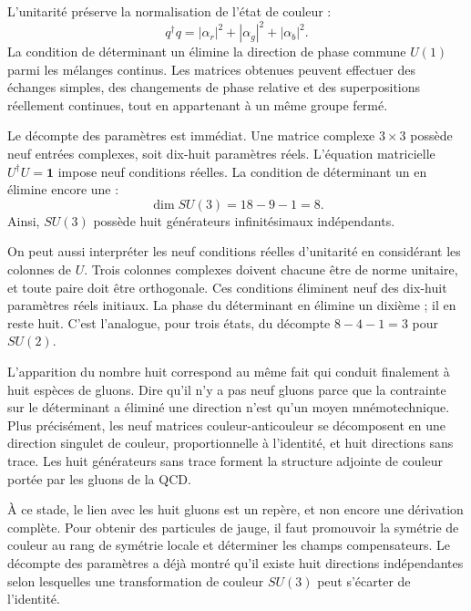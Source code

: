 L’unitarité préserve la normalisation de l’état de couleur :
\begin{equation}
q^\dagger q
=|\alpha_r|^2+|\alpha_g|^2+|\alpha_b|^2.
\end{equation}
La condition de déterminant un élimine la direction de phase commune \(U(1)\) parmi les mélanges continus. Les matrices obtenues peuvent effectuer des échanges simples, des changements de phase relative et des superpositions réellement continues, tout en appartenant à un même groupe fermé.

Le décompte des paramètres est immédiat. Une matrice complexe \(3\times3\) possède neuf entrées complexes, soit dix-huit paramètres réels. L’équation matricielle \(U^\dagger U=\boldsymbol 1\) impose neuf conditions réelles. La condition de déterminant un en élimine encore une :
\begin{equation}
\dim SU(3)=18-9-1=8.
\end{equation}
Ainsi, \(SU(3)\) possède huit générateurs infinitésimaux indépendants.

On peut aussi interpréter les neuf conditions réelles d’unitarité en considérant les colonnes de \(U\). Trois colonnes complexes doivent chacune être de norme unitaire, et toute paire doit être orthogonale. Ces conditions éliminent neuf des dix-huit paramètres réels initiaux. La phase du déterminant en élimine un dixième ; il en reste huit. C’est l’analogue, pour trois états, du décompte \(8-4-1=3\) pour \(SU(2)\).

L’apparition du nombre huit correspond au même fait qui conduit finalement à huit espèces de gluons. Dire qu’il n’y a pas neuf gluons parce que la contrainte sur le déterminant a éliminé une direction n’est qu’un moyen mnémotechnique. Plus précisément, les neuf matrices couleur-anticouleur se décomposent en une direction singulet de couleur, proportionnelle à l’identité, et huit directions sans trace. Les huit générateurs sans trace forment la structure adjointe de couleur portée par les gluons de la QCD.

À ce stade, le lien avec les huit gluons est un repère, et non encore une dérivation complète. Pour obtenir des particules de jauge, il faut promouvoir la symétrie de couleur au rang de symétrie locale et déterminer les champs compensateurs. Le décompte des paramètres a déjà montré qu’il existe huit directions indépendantes selon lesquelles une transformation de couleur \(SU(3)\) peut s’écarter de l’identité.

